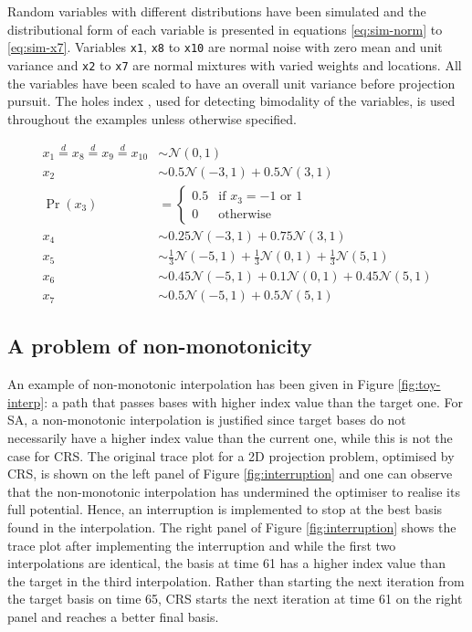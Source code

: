 Random variables with different distributions have been simulated and
the distributional form of each variable is presented in equations
\ref{eq:sim-norm} to \ref{eq:sim-x7}. Variables \texttt{x1}, \texttt{x8}
to \texttt{x10} are normal noise with zero mean and unit variance and
\texttt{x2} to \texttt{x7} are normal mixtures with varied weights and
locations. All the variables have been scaled to have an overall unit
variance before projection pursuit. The holes index
\citep{cook2008grand}, used for detecting bimodality of the variables,
is used throughout the examples unless otherwise specified.

\begin{align}
x_1 \overset{d}{=} x_8 \overset{d}{=} x_9 \overset{d}{=} x_{10}& \sim \mathcal{N}(0, 1) \label{eq:sim-norm} \\
x_2 &\sim 0.5 \mathcal{N}(-3, 1) + 0.5 \mathcal{N}(3, 1)\label{eq:sim-x2}\\
\Pr(x_3) &= 
\begin{cases}
0.5 & \text{if $x_3 = -1$ or $1$}\\
0 & \text{otherwise}
\end{cases}\label{eq:sim-x3}\\
x_4 &\sim 0.25 \mathcal{N}(-3, 1) + 0.75 \mathcal{N}(3, 1) \label{eq:sim-x4}\\
x_5 &\sim \frac{1}{3} \mathcal{N}(-5, 1) + \frac{1}{3} \mathcal{N}(0, 1) + \frac{1}{3} \mathcal{N}(5, 1)\label{eq:sim-x5}\\
x_6 &\sim 0.45 \mathcal{N}(-5, 1) + 0.1 \mathcal{N}(0, 1) + 0.45 \mathcal{N}(5, 1)\label{eq:sim-x6}\\
x_7 &\sim 0.5 \mathcal{N}(-5, 1) + 0.5 \mathcal{N}(5, 1) 
\label{eq:sim-x7}
\end{align}

\hypertarget{monotonic}{%
\subsection{A problem of non-monotonicity}\label{monotonic}}

An example of non-monotonic interpolation has been given in Figure
\ref{fig:toy-interp}: a path that passes bases with higher index value
than the target one. For SA, a non-monotonic interpolation is justified
since target bases do not necessarily have a higher index value than the
current one, while this is not the case for CRS. The original trace plot
for a 2D projection problem, optimised by CRS, is shown on the left
panel of Figure \ref{fig:interruption} and one can observe that the
non-monotonic interpolation has undermined the optimiser to realise its
full potential. Hence, an interruption is implemented to stop at the
best basis found in the interpolation. The right panel of Figure
\ref{fig:interruption} shows the trace plot after implementing the
interruption and while the first two interpolations are identical, the
basis at time 61 has a higher index value than the target in the third
interpolation. Rather than starting the next iteration from the target
basis on time 65, CRS starts the next iteration at time 61 on the right
panel and reaches a better final basis.

